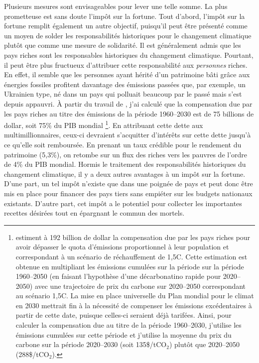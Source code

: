 \documentclass[a5paper,french]{memoir}
\begin{document}
Plusieurs mesures sont envisageables pour lever une telle somme. La plus prometteuse est sans doute l'impôt sur la fortune. Tout d'abord, l'impôt sur la fortune remplit également un autre objectif, puisqu'il peut être présenté comme un moyen de solder les responsabilités historiques pour le changement climatique plutôt que comme une mesure de solidarité. Il est généralement admis que les pays riches sont les responsables historiques du changement climatique. Pourtant, il peut être plus fructueux d'attribuer cette responsabilité aux \textit{personnes} riches. En effet, il semble que les personnes ayant hérité d'un patrimoine bâti grâce aux énergies fossiles profitent davantage des émissions passées que, par exemple, un Ukrainien type, né dans un pays qui polluait beaucoup par le passé mais s'est depuis appauvri. À partir du travail de \cite{fanning_compensation_2023}, j'ai calculé que la compensation due par les pays riches au titre des émissions de la période 1960--2030 est de 75 billions de dollar, soit 75\% du PIB mondial
\footnote{\cite{fanning_compensation_2023} estiment à 192 billion de dollar la compensation due par les pays riches pour avoir dépasser le quota d'émissions proportionnel à leur population et correspondant à un scénario de réchauffement de 1,5\textdegree{}C. Cette estimation est obtenue en multipliant les émissions cumulées sur la période sur la période 1960--2050 (en faisant l'hypothèse d'une décarbonatino rapide pour 2020--2050) avec une trajectoire de prix du carbone sur 2020--2050 correspondant au scénario 1,5\textdegree{}C. La mise en place universelle du Plan mondial pour le climat en 2030 mettrait fin à la nécessité de compenser les émissions excédentaires à partir de cette date, puisque celles-ci seraient déjà tarifées. Ainsi, pour calculer la compensation due au titre de la période 1960--2030, j'utilise les émissions cumulées sur cette période et j'utilise la moyenne du prix du carbone sur la période 2020--2030 (soit 135\$/tCO$_\text{2}$) plutôt que 2020--2050 (288\$/tCO$_\text{2}$).}. %
En attribuant cette dette aux multimillionnaires, ceux-ci devraient s'acquitter d'intérêts sur cette dette jusqu'à ce qu'elle soit remboursée. En prenant un taux crédible pour le rendement du patrimoine (5,3\%), on retombe sur un flux des riches vers les pauvres de l'ordre de 4\% du PIB mondial. Hormis le traitement des responsabilités historiques du changement climatique, il y a deux autres avantages à un impôt sur la fortune. D'une part, un tel impôt n'existe que dans une poignée de pays et peut donc être mis en place pour financer des pays tiers sans empiéter sur les budgets nationaux existants. D'autre part, cet impôt a le potentiel pour collecter %
les importantes recettes désirées tout en épargnant le commun des mortels. %
\end{document}
